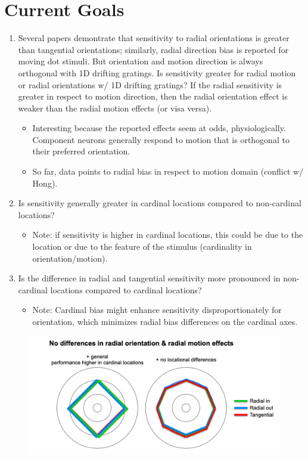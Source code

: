 \documentclass[11pt]{article} %
\begin{document}
\section{Current Goals} 
\begin{enumerate}
	\item Several papers demontrate that sensitivity to radial orientations is greater than tangential orientations; similarly, radial direction bias is reported for moving dot stimuli. But orientation and motion direction is always orthogonal with 1D drifting gratings. Is sensitivity greater for radial motion or radial orientations w/ 1D drifting gratings? If the radial sensitivity is greater in respect to motion direction, then the radial orientation effect is weaker than the radial motion effects (or visa versa).
	\begin{itemize}
	\item{Interesting because the reported effects seem at odds, physiologically. Component neurons generally respond to motion that is orthogonal to their preferred orientation.} 
	\item{So far, data points to radial bias in respect to motion domain (conflict w/ Hong).}
	\end{itemize}
	\item Is sensitivity generally greater in cardinal locations compared to non-cardinal locations?
	\begin{itemize}
	\item{Note: if sensitivity is higher in cardinal locations, this could be due to the location or due to the feature of the stimulus (cardinality in orientation/motion).}
	\end{itemize}
	\item Is the difference in radial and tangential sensitivity more pronounced in non-cardinal locations compared to cardinal locations?
	\begin{itemize}
	\item{Note: Cardinal bias might enhance sensitivity disproportionately for orientation, which minimizes radial bias differences on the cardinal axes.}
	\end{itemize}
	\end{enumerate}
	\begin{figure}[H]
	\centering %
	\includegraphics[scale=.25]{Images/Cartoon1.png}
	\end{figure}
\end{document}

